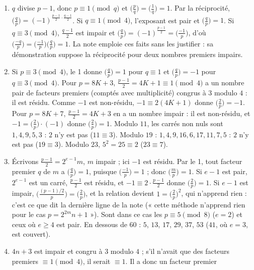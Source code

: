 \documentclass[11pt,a4paper]{article}
\begin{document}
\begin{solution}
\begin{enumerate}
\item $q$ divise $p - 1$, donc $p \equiv 1 \pmod q$ et $\bigl(\frac pq\bigr) =
  \bigl(\frac1q\bigr) = 1$. Par la réciprocité, $\bigl(\frac qp\bigr) =
  (-1)^{\frac{p-1}{2}\cdot\frac{q-1}{2}}$. Si $q \equiv 1 \pmod 4$, l'exposant est pair
  et $\bigl(\frac qp\bigr) = 1$. Si $q \equiv 3 \pmod 4$, $\frac{q-1}{2}$ est impair et
  $\bigl(\frac qp\bigr) = (-1)^{\frac{p-1}{2}} = \bigl(\frac{-1}{p}\bigr)$, d'où
  $\bigl(\frac{-q}{p}\bigr) = \bigl(\frac{-1}{p}\bigr)\bigl(\frac qp\bigr) = 1$. La note
  emploie ces faits sans les justifier : sa démonstration suppose la réciprocité pour
  deux nombres premiers impairs.
\item Si $p \equiv 3 \pmod 4$, le 1 donne $\bigl(\frac qp\bigr) = 1$ pour
  $q \equiv 1$ et $\bigl(\frac qp\bigr) = -1$ pour $q \equiv 3 \pmod 4$. Pour
  $p = 8K + 3$, $\frac{p-1}{2} = 4K + 1 \equiv 1 \pmod 4$ a un nombre pair de facteurs
  premiers (comptés avec multiplicité) congrus à $3$ modulo $4$ : il est résidu. Comme
  $-1$ est non-résidu, $-1 \equiv 2(4K+1)$ donne $\bigl(\frac2p\bigr) = -1$. Pour
  $p = 8K + 7$, $\frac{p-1}{2} = 4K + 3$ en a un nombre impair : il est non-résidu, et
  $-1 = \bigl(\frac2p\bigr)\cdot(-1)$ donne $\bigl(\frac2p\bigr) = 1$. Modulo $11$, les
  carrés non nuls sont $1, 4, 9, 5, 3$ : $2$ n'y est pas ($11 \equiv 3$). Modulo $19$ :
  $1, 4, 9, 16, 6, 17, 11, 7, 5$ : $2$ n'y est pas ($19 \equiv 3$). Modulo $23$,
  $5^2 = 25 \equiv 2$ ($23 \equiv 7$).
\item Écrivons $\frac{p-1}{2} = 2^{e-1}m$, $m$ impair ; ici $-1$ est résidu. Par le 1,
  tout facteur premier $q$ de $m$ a $\bigl(\frac qp\bigr) = 1$, puisque
  $\bigl(\frac{-1}{p}\bigr) = 1$ ; donc $\bigl(\frac mp\bigr) = 1$. Si $e - 1$ est pair,
  $2^{e-1}$ est un carré, $\frac{p-1}{2}$ est résidu, et $-1 \equiv 2\cdot\frac{p-1}{2}$
  donne $\bigl(\frac2p\bigr) = 1$. Si $e - 1$ est impair,
  $\bigl(\frac{(p-1)/2}{p}\bigr) = \bigl(\frac2p\bigr)$, et la relation devient
  $1 = \bigl(\frac2p\bigr)^2$, qui n'apprend rien : c'est ce que dit la dernière ligne
  de la note (« cette méthode n'apprend rien pour le cas $p = 2^{2m}n+1$ »). Sont dans
  ce cas les $p \equiv 5 \pmod 8$ ($e = 2$) et ceux où $e \ge 4$ est pair. En dessous
  de $60$ : $5$, $13$, $17$, $29$, $37$, $53$ ($41$, où $e = 3$, est couvert).
\item $4n + 3$ est impair et congru à $3$ modulo $4$ ; s'il n'avait que des facteurs
  premiers $\equiv 1 \pmod 4$, il serait $\equiv 1$. Il a donc un facteur premier

\end{enumerate}
\end{solution}
\end{document}

